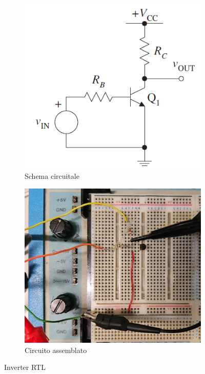 \documentclass[a4paper,12pt]{article}
\begin{document}
\begin{figure}[ht] \label{fig: inverter}
  \centering
  \begin{subfigure}{0.45\textwidth}
    \includegraphics[width=\linewidth]{Schematic_Inverter.png}
    \caption{Schema circuitale}
  \end{subfigure}
  \hspace{0.05\textwidth}
  \begin{subfigure}{0.45\textwidth}
    \includegraphics[width=\linewidth]{Inverter_montato.jpg}
    \caption{Circuito assemblato}
  \end{subfigure}
  \caption{Inverter RTL}
\end{figure}
\end{document}

